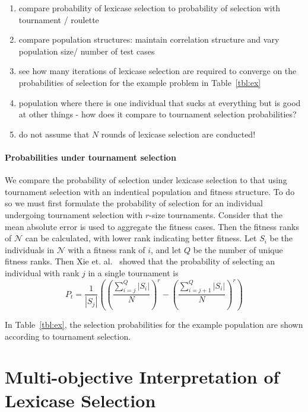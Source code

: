 \documentclass[preprint]{article}
\begin{document}
\begin{enumerate}
\item compare probability of lexicase selection to probability of selection with tournament / roulette 
\item compare population structures: maintain correlation structure and vary population size/ number of test cases
\item see how many iterations of lexicase selection are required to converge on the probabilities of selection for the example problem in Table~\ref{tbl:ex}
\item population where there is one individual that sucks at everything but is good at other things - how does it compare to tournament selection probabilities?
\item do not assume that $N$ rounds of lexicase selection are conducted!
\end{enumerate}

\paragraph{Probabilities under tournament selection} We compare the probability of selection under lexicase selection to that using tournament selection with an indentical population and fitness structure. To do so we must first formulate the probability of selection for an individual undergoing tournament selection with $r$-size tournaments. Consider that the mean absolute error is used to aggregate the fitness cases. Then the fitness ranks of $\mathcal{N}$ can be calculated, with lower rank indicating better fitness. Let $S_i$ be the individuals in $\mathcal{N}$ with a fitness rank of $i$, and let $Q$ be the number of unique fitness ranks. Then Xie et. al.~\cite{xie_another_2007} showed that the probability of selecting an individual with rank $j$ in a single tournament is 
\begin{equation}
P_t = \frac{1}{|S_j|}\left( \left(\frac{\sum_{i=j}^Q{|S_i|}}{N}\right)^r - \left(\frac{\sum_{i=j+1}^Q{|S_i|}}{N}\right)^r \right)
\end{equation}

In Table~\ref{tbl:ex}, the selection probabilities for the example population are shown according to tournament selection. 

\section{Multi-objective Interpretation of Lexicase Selection}
\end{document}
